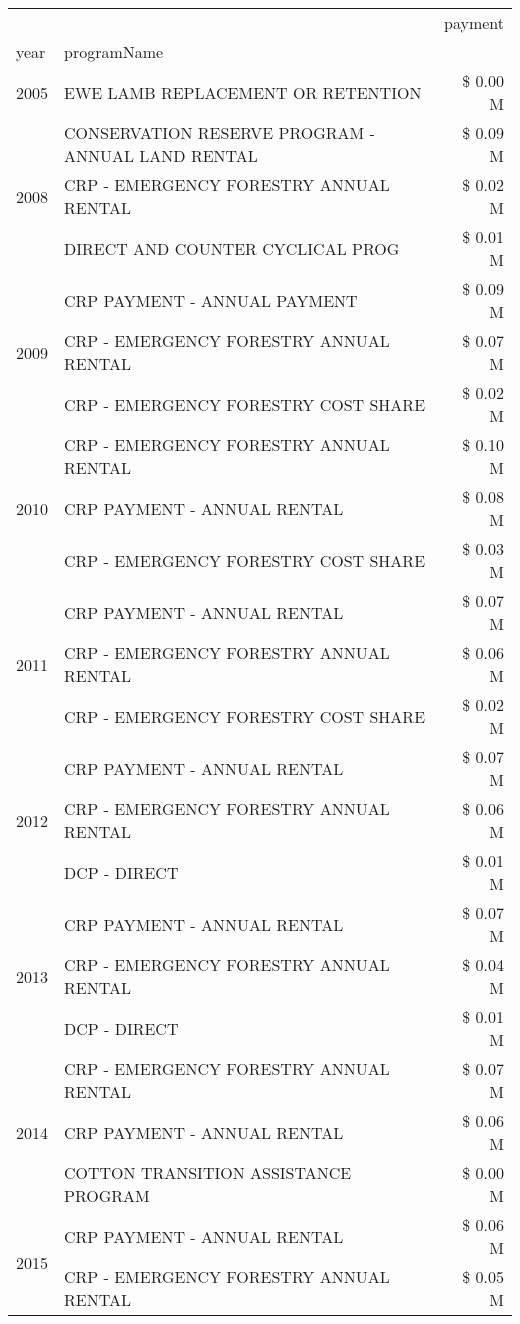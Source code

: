 \begin{tabular}{llr}
\toprule
 &  & payment \\
year & programName &  \\
\midrule
2005 & EWE LAMB REPLACEMENT OR RETENTION & \$ 0.00 M \\
\cline{1-3}
\multirow[t]{3}{*}{2008} & CONSERVATION RESERVE PROGRAM - ANNUAL LAND RENTAL & \$ 0.09 M \\
 & CRP - EMERGENCY FORESTRY ANNUAL RENTAL & \$ 0.02 M \\
 & DIRECT AND COUNTER CYCLICAL PROG & \$ 0.01 M \\
\cline{1-3}
\multirow[t]{3}{*}{2009} & CRP PAYMENT - ANNUAL PAYMENT & \$ 0.09 M \\
 & CRP - EMERGENCY FORESTRY ANNUAL RENTAL & \$ 0.07 M \\
 & CRP - EMERGENCY FORESTRY COST SHARE & \$ 0.02 M \\
\cline{1-3}
\multirow[t]{3}{*}{2010} & CRP - EMERGENCY FORESTRY ANNUAL RENTAL & \$ 0.10 M \\
 & CRP PAYMENT - ANNUAL RENTAL & \$ 0.08 M \\
 & CRP - EMERGENCY FORESTRY COST SHARE & \$ 0.03 M \\
\cline{1-3}
\multirow[t]{3}{*}{2011} & CRP PAYMENT - ANNUAL RENTAL & \$ 0.07 M \\
 & CRP - EMERGENCY FORESTRY ANNUAL RENTAL & \$ 0.06 M \\
 & CRP - EMERGENCY FORESTRY COST SHARE & \$ 0.02 M \\
\cline{1-3}
\multirow[t]{3}{*}{2012} & CRP PAYMENT - ANNUAL RENTAL & \$ 0.07 M \\
 & CRP - EMERGENCY FORESTRY ANNUAL RENTAL & \$ 0.06 M \\
 & DCP - DIRECT & \$ 0.01 M \\
\cline{1-3}
\multirow[t]{3}{*}{2013} & CRP PAYMENT - ANNUAL RENTAL & \$ 0.07 M \\
 & CRP - EMERGENCY FORESTRY ANNUAL RENTAL & \$ 0.04 M \\
 & DCP - DIRECT & \$ 0.01 M \\
\cline{1-3}
\multirow[t]{3}{*}{2014} & CRP - EMERGENCY FORESTRY ANNUAL RENTAL & \$ 0.07 M \\
 & CRP PAYMENT - ANNUAL RENTAL & \$ 0.06 M \\
 & COTTON TRANSITION ASSISTANCE PROGRAM & \$ 0.00 M \\
\cline{1-3}
\multirow[t]{3}{*}{2015} & CRP PAYMENT - ANNUAL RENTAL & \$ 0.06 M \\
 & CRP - EMERGENCY FORESTRY ANNUAL RENTAL & \$ 0.05 M \\

\end{tabular}
